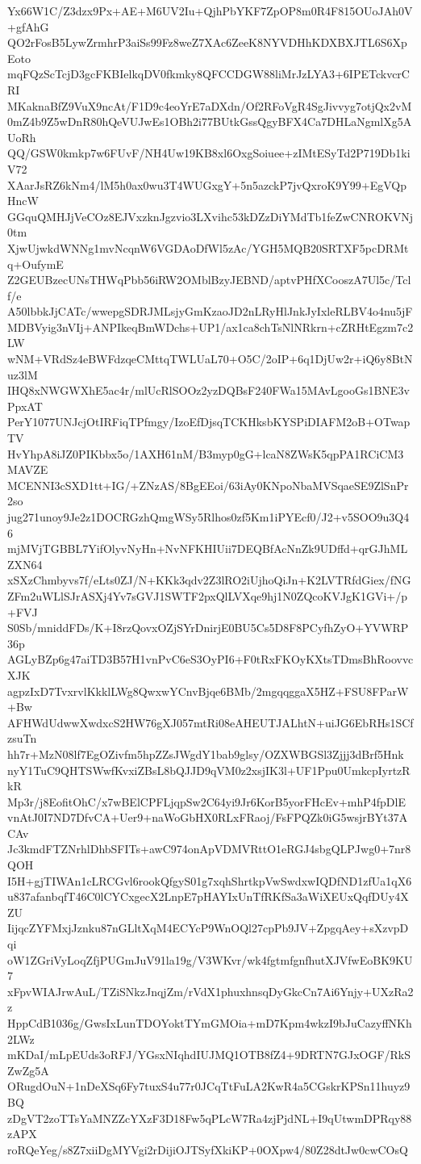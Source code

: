 Yx66W1C/Z3dzx9Px+AE+M6UV2Iu+QjhPbYKF7ZpOP8m0R4F815OUoJAh0V+gfAhG
QO2rFosB5LywZrmhrP3aiSs99Fz8weZ7XAc6ZeeK8NYVDHhKDXBXJTL6S6XpEoto
mqFQzScTcjD3gcFKBIelkqDV0fkmky8QFCCDGW88liMrJzLYA3+6IPETckvcrCRI
MKaknaBfZ9VuX9ncAt/F1D9c4eoYrE7aDXdn/Of2RFoVgR4SgJivvyg7otjQx2vM
0mZ4b9Z5wDnR80hQeVUJwEs1OBh2i77BUtkGssQgyBFX4Ca7DHLaNgmlXg5AUoRh
QQ/GSW0kmkp7w6FUvF/NH4Uw19KB8xl6OxgSoiuee+zIMtESyTd2P719Db1kiV72
XAarJsRZ6kNm4/lM5h0ax0wu3T4WUGxgY+5n5azckP7jvQxroK9Y99+EgVQpHncW
GGquQMHJjVeCOz8EJVxzknJgzvio3LXvihc53kDZzDiYMdTb1feZwCNROKVNj0tm
XjwUjwkdWNNg1mvNcqnW6VGDAoDfWl5zAc/YGH5MQB20SRTXF5pcDRMtq+OufymE
Z2GEUBzecUNsTHWqPbb56iRW2OMblBzyJEBND/aptvPHfXCooszA7Ul5c/Tclf/e
A50lbbkJjCATc/wwepgSDRJMLsjyGmKzaoJD2nLRyHlJnkJyIxleRLBV4o4nu5jF
MDBVyig3nVIj+ANPIkeqBmWDchs+UP1/ax1ca8chTsNlNRkrn+cZRHtEgzm7c2LW
wNM+VRdSz4eBWFdzqeCMttqTWLUaL70+O5C/2oIP+6q1DjUw2r+iQ6y8BtNuz3lM
IHQ8xNWGWXhE5ac4r/mlUcRlSOOz2yzDQBsF240FWa15MAvLgooGs1BNE3vPpxAT
PerY1077UNJcjOtIRFiqTPfmgy/IzoEfDjsqTCKHksbKYSPiDIAFM2oB+OTwapTV
HvYhpA8iJZ0PIKbbx5o/1AXH61nM/B3myp0gG+lcaN8ZWsK5qpPA1RCiCM3MAVZE
MCENNI3cSXD1tt+IG/+ZNzAS/8BgEEoi/63iAy0KNpoNbaMVSqaeSE9ZlSnPr2so
jug271unoy9Je2z1DOCRGzhQmgWSy5Rlhos0zf5Km1iPYEcf0/J2+v5SOO9u3Q46
mjMVjTGBBL7YifOlyvNyHn+NvNFKHIUii7DEQBfAcNnZk9UDffd+qrGJhMLZXN64
xSXzChmbyvs7f/eLts0ZJ/N+KKk3qdv2Z3lRO2iUjhoQiJn+K2LVTRfdGiex/fNG
ZFm2uWLlSJrASXj4Yv7sGVJ1SWTF2pxQlLVXqe9hj1N0ZQcoKVJgK1GVi+/p+FVJ
S0Sb/mniddFDs/K+I8rzQovxOZjSYrDnirjE0BU5Cs5D8F8PCyfhZyO+YVWRP36p
AGLyBZp6g47aiTD3B57H1vnPvC6eS3OyPI6+F0tRxFKOyKXtsTDmsBhRoovvcXJK
agpzIxD7TvxrvlKkklLWg8QwxwYCnvBjqe6BMb/2mgqqggaX5HZ+FSU8FParW+Bw
AFHWdUdwwXwdxcS2HW76gXJ057mtRi08eAHEUTJALhtN+uiJG6EbRHs1SCfzsuTn
hh7r+MzN08lf7EgOZivfm5hpZZsJWgdY1bab9glsy/OZXWBGSl3Zjjj3dBrf5Hnk
nyY1TuC9QHTSWwfKvxiZBsL8bQJJD9qVM0z2xsjIK3l+UF1Ppu0UmkcpIyrtzRkR
Mp3r/j8EofitOhC/x7wBElCPFLjqpSw2C64yi9Jr6KorB5yorFHcEv+mhP4fpDlE
vnAtJ0I7ND7DfvCA+Uer9+naWoGbHX0RLxFRaoj/FsFPQZk0iG5wsjrBYt37ACAv
Jc3kmdFTZNrhlDhbSFITs+awC974onApVDMVRttO1eRGJ4sbgQLPJwg0+7nr8QOH
I5H+gjTIWAn1cLRCGvl6rookQfgyS01g7xqhShrtkpVwSwdxwIQDfND1zfUa1qX6
u837afanbqfT46C0lCYCxgecX2LnpE7pHAYIxUnTfRKfSa3aWiXEUxQqfDUy4XZU
IijqcZYFMxjJznku87nGLltXqM4ECYcP9WnOQl27cpPb9JV+ZpgqAey+sXzvpDqi
oW1ZGriVyLoqZfjPUGmJuV91la19g/V3WKvr/wk4fgtmfgnfhutXJVfwEoBK9KU7
xFpvWIAJrwAuL/TZiSNkzJnqjZm/rVdX1phuxhnsqDyGkcCn7Ai6Ynjy+UXzRa2z
HppCdB1036g/GwsIxLunTDOYoktTYmGMOia+mD7Kpm4wkzI9bJuCazyffNKh2LWz
mKDaI/mLpEUds3oRFJ/YGsxNIqhdIUJMQ1OTB8fZ4+9DRTN7GJxOGF/RkSZwZg5A
ORugdOuN+1nDeXSq6Fy7tuxS4u77r0JCqTtFuLA2KwR4a5CGskrKPSn11huyz9BQ
zDgVT2zoTTsYaMNZZcYXzF3D18Fw5qPLcW7Ra4zjPjdNL+I9qUtwmDPRqy88zAPX
roRQeYeg/s8Z7xiiDgMYVgi2rDijiOJTSyfXkiKP+0OXpw4/80Z28dtJw0cwCOsQ
